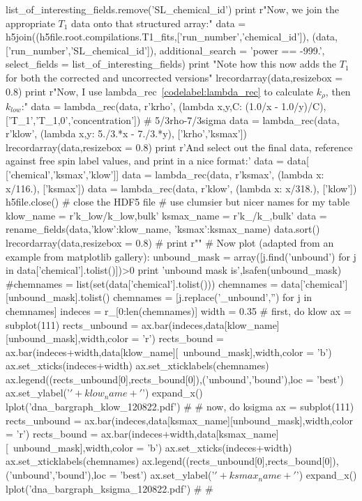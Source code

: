 \begin{python}
list_of_interesting_fields.remove('SL_chemical_id')
print r"Now, we join the appropriate $T_1$ data onto that structured array:"
data = h5join((h5file.root.compilations.T1_fits,['run_number','chemical_id']),
    (data,['run_number','SL_chemical_id']),
    additional_search = 'power == -999.',
    select_fields = list_of_interesting_fields)
print "Note how this now adds the $T_1$ for both the corrected and uncorrected versions"
lrecordarray(data,resizebox = 0.8)
print r"Now, I use lambda\_rec~\ref{codelabel:lambda_rec} to calculate $k_\rho$, then $k_{low}$:"
data = lambda_rec(data,
    r'krho',
    (lambda x,y,C: (1.0/x - 1.0/y)/C),
    ['T_1','T_{1,0}','concentration'])
# 5/3rho-7/3sigma
data = lambda_rec(data,
    r'klow',
    (lambda x,y: 5./3.*x - 7./3.*y),
    ['krho','ksmax'])
lrecordarray(data,resizebox = 0.8)
print r'And select out the final data, reference against free spin label values, and print in a nice format:'
data = data[ ['chemical','ksmax','klow']]
data = lambda_rec(data,
    r'ksmax',
    (lambda x: x/116.),
    ['ksmax'])
data = lambda_rec(data,
    r'klow',
    (lambda x: x/318.),
    ['klow'])
h5file.close() # close the HDF5 file
#{{{ use clumsier but nicer names for my table
klow_name = r'k_{low}/k_{low,bulk}'
ksmax_name = r'k_{\sigma}/k_{\sigma,bulk}'
data = rename_fields(data,{'klow':klow_name,
                            'ksmax':ksmax_name})
data.sort()
lrecordarray(data,resizebox = 0.8)
#}}}
print r"{\color{red}{\bf This particular example is having trouble because of how I'm trying to sort the data $\Rightarrow$ what I used to have only worked when there was just one piece of data per chemical, but since I fixed the code, the repeats are also included}}"
#{{{ Now plot (adapted from an example from matplotlib gallery):
unbound_mask = array([j.find('unbound') for j in data['chemical'].tolist()])>0
print 'unbound mask is',lsafen(unbound_mask)
#chemnames = list(set(data['chemical'].tolist()))
chemnames = data['chemical'][unbound_mask].tolist()
chemnames = [j.replace('_unbound','') for j in chemnames]
indeces = r_[0:len(chemnames)]
width = 0.35
#{{{ first, do klow
ax = subplot(111)
rects_unbound = ax.bar(indeces,data[klow_name][unbound_mask],width,color = 'r')
rects_bound = ax.bar(indeces+width,data[klow_name][~unbound_mask],width,color = 'b')
ax.set_xticks(indeces+width)
ax.set_xticklabels(chemnames)
ax.legend((rects_unbound[0],rects_bound[0]),('unbound','bound'),loc = 'best')
ax.set_ylabel('$'+klow_name+'$')
expand_x()
lplot('dna_bargraph_klow_120822.pdf')
#}}}
#{{{ now, do ksigma
ax = subplot(111)
rects_unbound = ax.bar(indeces,data[ksmax_name][unbound_mask],width,color = 'r')
rects_bound = ax.bar(indeces+width,data[ksmax_name][~unbound_mask],width,color = 'b')
ax.set_xticks(indeces+width)
ax.set_xticklabels(chemnames)
ax.legend((rects_unbound[0],rects_bound[0]),('unbound','bound'),loc = 'best')
ax.set_ylabel('$'+ksmax_name+'$')
expand_x()
lplot('dna_bargraph_ksigma_120822.pdf')
#}}}
#}}}
\end{python}


